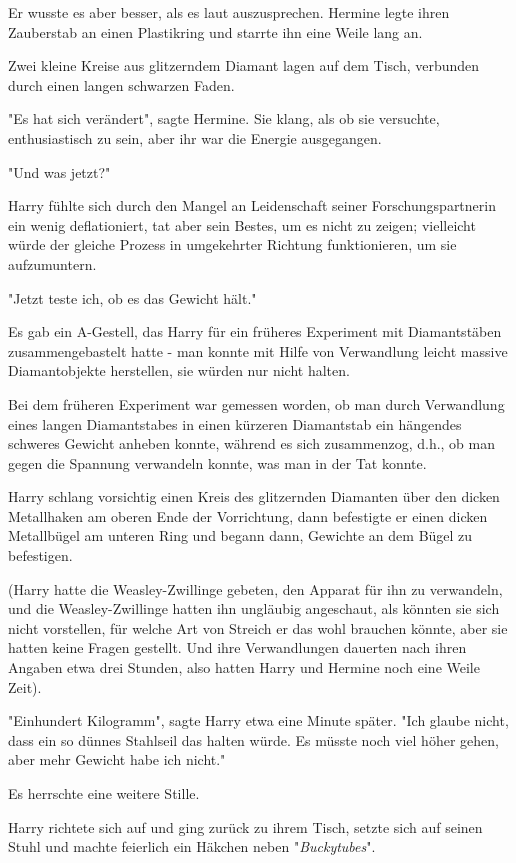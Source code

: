 {Er wusste es aber besser, als es laut auszusprechen. Hermine legte ihren Zauberstab an einen Plastikring und starrte ihn eine Weile lang an.

Zwei kleine Kreise aus glitzerndem Diamant lagen auf dem Tisch, verbunden durch einen langen schwarzen Faden.

"Es hat sich verändert", sagte Hermine. Sie klang, als ob sie versuchte, enthusiastisch zu sein, aber ihr war die Energie ausgegangen.

"Und was jetzt?"

Harry fühlte sich durch den Mangel an Leidenschaft seiner Forschungspartnerin ein wenig deflationiert, tat aber sein Bestes, um es nicht zu zeigen; vielleicht würde der gleiche Prozess in umgekehrter Richtung funktionieren, um sie aufzumuntern.

"Jetzt teste ich, ob es das Gewicht hält."

Es gab ein A-Gestell, das Harry für ein früheres Experiment mit Diamantstäben zusammengebastelt hatte - man konnte mit Hilfe von Verwandlung leicht massive Diamantobjekte herstellen, sie würden nur nicht halten.

Bei dem früheren Experiment war gemessen worden, ob man durch Verwandlung eines langen Diamantstabes in einen kürzeren Diamantstab ein hängendes schweres Gewicht anheben konnte, während es sich zusammenzog, d.h., ob man gegen die Spannung verwandeln konnte, was man in der Tat konnte.

Harry schlang vorsichtig einen Kreis des glitzernden Diamanten über den dicken Metallhaken am oberen Ende der Vorrichtung, dann befestigte er einen dicken Metallbügel am unteren Ring und begann dann, Gewichte an dem Bügel zu befestigen.

(Harry hatte die Weasley-Zwillinge gebeten, den Apparat für ihn zu verwandeln, und die Weasley-Zwillinge hatten ihn ungläubig angeschaut, als könnten sie sich nicht vorstellen, für welche Art von Streich er das wohl brauchen könnte, aber sie hatten keine Fragen gestellt. Und ihre Verwandlungen dauerten nach ihren Angaben etwa drei Stunden, also hatten Harry und Hermine noch eine Weile Zeit).

"Einhundert Kilogramm", sagte Harry etwa eine Minute später. "Ich glaube nicht, dass ein so dünnes Stahlseil das halten würde. Es müsste noch viel höher gehen, aber mehr Gewicht habe ich nicht."

Es herrschte eine weitere Stille.

Harry richtete sich auf und ging zurück zu ihrem Tisch, setzte sich auf seinen Stuhl und machte feierlich ein Häkchen neben "\emph{Buckytubes}".

}
